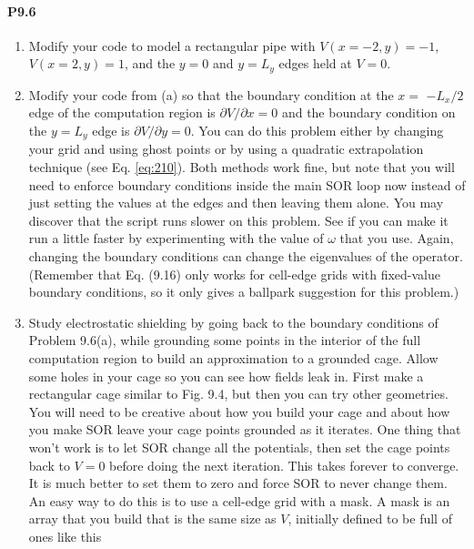 \paragraph*{P9.6}
\begin{enumerate}[label=(\alph*)]
\item Modify your code to model a rectangular pipe with $V(x=-2, y)=-1$, $V(x=2, y)=1$, and the $y=0$ and $y=L_{y}$ edges held at $V=0$.
\item Modify your code from (a) so that the boundary condition at the $x=$ $-L_{x} / 2$ edge of the computation region is $\partial V / \partial x=0$ and the boundary condition on the $y=L_{y}$ edge is $\partial V / \partial y=0$. You can do this problem either by changing your grid and using ghost points or by using a quadratic extrapolation technique (see Eq. \eqref{eq:210}). Both methods work fine, but note that you will need to enforce boundary conditions inside the main SOR loop now instead of just setting the values at the edges and then leaving them alone.
You may discover that the script runs slower on this problem. See if you can make it run a little faster by experimenting with the value of $\omega$ that you use. Again, changing the boundary conditions can change the eigenvalues of the operator. (Remember that Eq. (9.16) only works for cell-edge grids with fixed-value boundary conditions, so it only gives a ballpark suggestion for this problem.)
\item Study electrostatic shielding by going back to the boundary conditions of Problem 9.6(a), while grounding some points in the interior of the full computation region to build an approximation to a grounded cage. Allow some holes in your cage so you can see how fields leak in. First make a rectangular cage similar to Fig. 9.4, but then you can try other geometries.
You will need to be creative about how you build your cage and about how you make SOR leave your cage points grounded as it iterates. One thing that won\rq t work is to let SOR change all the potentials, then set the cage points back to $V=0$ before doing the next iteration. This takes forever to converge. It is much better to set them to zero and force SOR to never change them. An easy way to do this is to use a cell-edge grid with a mask. A mask is an array that you build that is the same size as $V$, initially defined to be full of ones like this

\end{enumerate}
